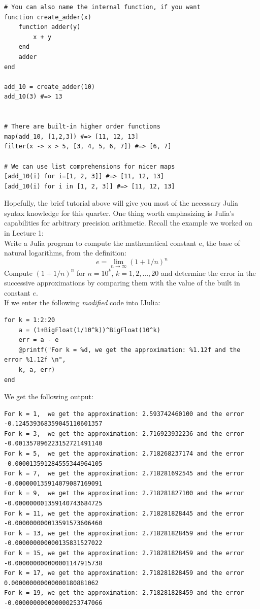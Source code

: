 \documentclass[11pt,a4paper,oneside]{report}
\begin{document}
\begin{verbatim}
# You can also name the internal function, if you want
function create_adder(x)
    function adder(y)
        x + y
    end
    adder
end

add_10 = create_adder(10)
add_10(3) #=> 13


# There are built-in higher order functions
map(add_10, [1,2,3]) #=> [11, 12, 13]
filter(x -> x > 5, [3, 4, 5, 6, 7]) #=> [6, 7]

# We can use list comprehensions for nicer maps
[add_10(i) for i=[1, 2, 3]] #=> [11, 12, 13]
[add_10(i) for i in [1, 2, 3]] #=> [11, 12, 13]

\end{verbatim}

Hopefully, the brief tutorial above will give you most of the necessary Julia syntax knowledge for this quarter. One thing worth emphasizing is Julia's capabilities for arbitrary precision arithmetic. Recall the example we worked on in Lecture 1: \\

Write a Julia program to compute the mathematical constant e, the base of natural logarithms, from the definition:
\[ e = \lim\limits_{n \rightarrow \infty} (1+1/n)^n \]
Compute $(1 + 1/n)^n$ for $n = 10^k$, $k = 1, 2, ..., 20$ and determine the error in the successive approximations by comparing them with the value of the built in constant $e$.  \\

If we enter the following \emph{modified} code into IJulia:\\

\begin{verbatim}
for k = 1:2:20
    a = (1+BigFloat(1/10^k))^BigFloat(10^k)
    err = a - e
    @printf("For k = %d, we get the approximation: %1.12f and the error %1.12f \n", 
    k, a, err)
end
\end{verbatim}

We get the following output:
\begin{verbatim}
For k = 1,  we get the approximation: 2.593742460100 and the error -0.124539368359045110601357 
For k = 3,  we get the approximation: 2.716923932236 and the error -0.001357896223152721491140 
For k = 5,  we get the approximation: 2.718268237174 and the error -0.000013591284555344964105 
For k = 7,  we get the approximation: 2.718281692545 and the error -0.000000135914079087169091 
For k = 9,  we get the approximation: 2.718281827100 and the error -0.000000001359140743684725 
For k = 11, we get the approximation: 2.718281828445 and the error -0.000000000013591573606460 
For k = 13, we get the approximation: 2.718281828459 and the error -0.000000000000135831527022 
For k = 15, we get the approximation: 2.718281828459 and the error -0.000000000000001147915738 
For k = 17, we get the approximation: 2.718281828459 and the error  0.000000000000000180881062 
For k = 19, we get the approximation: 2.718281828459 and the error -0.000000000000000253747066
\end{verbatim}
\end{document}

